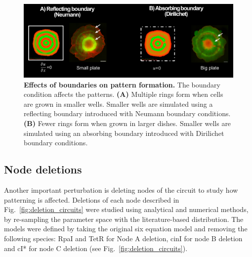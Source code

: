 \begin{figure}[H] %
    \centering
    \begin{adjustbox}{center}
        \includegraphics[width=1\textwidth]{chapters/Chapter 3/boundary_conditions_colony} %
    \end{adjustbox}
    \caption{\textbf{Effects of boundaries on pattern formation.} The boundary condition affects the patterns. \textbf{(A)} Multiple rings form when cells are grown in smaller wells. Smaller wells are simulated using a reflecting boundary introduced with Neumann boundary conditions. \textbf{(B)} Fewer rings form when grown in larger dishes. Smaller wells are simulated using an absorbing boundary introduced with Dirilichet boundary conditions.}
    \label{fig:boundary_conditions_colony}
\end{figure}

\subsection{Node deletions}
Another important perturbation is deleting nodes of the circuit to study how patterning is affected.
Deletions of each node described in Fig.~\ref{fig:deletion_circuits} were studied using analytical and numerical methods, by re-sampling the parameter space with the literature-based distribution.
The models were defined by taking the original six equation model and removing the following species: RpaI and TetR for Node A deletion, cinI for node B deletion and cI* for node C deletion (see Fig.~\ref{fig:deletion_circuits}).

